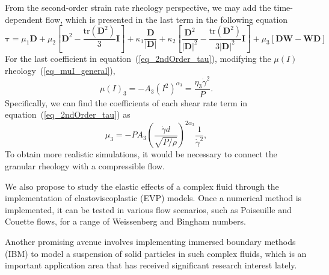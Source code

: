 \par
From the second-order strain rate rheology perspective, we may add the time-dependent flow, which is presented in the last term in the following equation
\begin{equation}
  \bm{\tau} =  \mu_1 {\bm D} 
    + \mu_2  \left[ {\bm D}^2  - \frac{\text{tr}\left({\bm D}^2\right)}{3}{\bm I} \right]
   + \kappa_1 \frac{{\bm D}}{|{\bm D}|} 
    + \kappa_2  \left[ \frac{{\bm D}^2}{|{\bm D}|^2}  
    - \frac{\text{tr}\left({\bm D}^2\right)}{3|{\bm D}|^2}{\bm I} \right]
    + \mu_3  \left[ {\bm D}{\bm W} - {\bm W}{\bm D} \right]
  \end{equation}
  For the last coefficient in equation~(\ref{eq_2ndOrder_tau}), modifying the $\mu(I)$ rheology~(\ref{eq_muI_general}),
\begin{equation}
    \mu(I)_3 = -A_3 \left( I^2 \right)^{\alpha_3} = \frac{\eta_3 \dot{\gamma}^2}{P}.
\label{eq_muI3}
\end{equation}
Specifically, we can find the coefficients of each shear rate term in equation~(\ref{eq_2ndOrder_tau}) as
\begin{equation}
     \mu_3  = 
    - P A_3 
        \left( \frac{\dot{\gamma} d }{\sqrt{P /\rho}}  \right)^{2\alpha_3} 
        \frac{1}{\dot{\gamma}^2},
\label{eq_gr_eta_3}
\end{equation}
To obtain more realistic simulations, it would be necessary to connect the granular rheology with a compressible flow.
\par
We also propose to study the elastic effects of a complex fluid through the implementation of elastoviscoplastic (EVP) models. 
Once a numerical method is implemented, it can be tested in various flow scenarios, such as Poiseuille and Couette flows, for a range of Weissenberg and Bingham numbers.  
\par
Another promising avenue involves implementing immersed boundary methods (IBM) to model a suspension of solid particles in such complex fluids, which is an important application area that has received significant research interest lately. 

